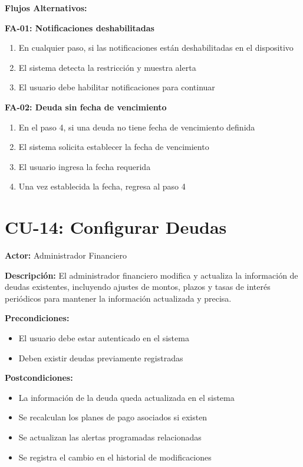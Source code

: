 \noindent\textbf{Flujos Alternativos:}

\textbf{FA-01: Notificaciones deshabilitadas}
\begin{enumerate}
    \item En cualquier paso, si las notificaciones están deshabilitadas en el dispositivo
    \item El sistema detecta la restricción y muestra alerta
    \item El usuario debe habilitar notificaciones para continuar
\end{enumerate}

\textbf{FA-02: Deuda sin fecha de vencimiento}
\begin{enumerate}
    \item En el paso 4, si una deuda no tiene fecha de vencimiento definida
    \item El sistema solicita establecer la fecha de vencimiento
    \item El usuario ingresa la fecha requerida
    \item Una vez establecida la fecha, regresa al paso 4
\end{enumerate}

\section{CU-14: Configurar Deudas}

\noindent\textbf{Actor:} Administrador Financiero

\noindent\textbf{Descripción:} El administrador financiero modifica y actualiza la información de deudas existentes, incluyendo ajustes de montos, plazos y tasas de interés periódicos para mantener la información actualizada y precisa.

\noindent\textbf{Precondiciones:}
\begin{itemize}
    \item El usuario debe estar autenticado en el sistema
    \item Deben existir deudas previamente registradas
\end{itemize}

\noindent\textbf{Postcondiciones:}
\begin{itemize}
    \item La información de la deuda queda actualizada en el sistema
    \item Se recalculan los planes de pago asociados si existen
    \item Se actualizan las alertas programadas relacionadas
    \item Se registra el cambio en el historial de modificaciones
\end{itemize}

